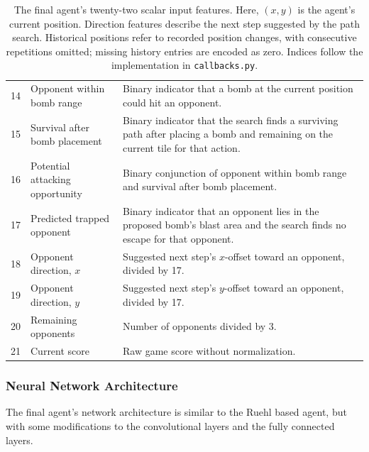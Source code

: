 \documentclass[11pt,a4paper]{article}
\begin{document}
\begin{table}[htbp]
\begin{tabularx}{\textwidth}{@{}r>{\raggedright\arraybackslash}p{4.2cm}Y@{}}
14 & Opponent within bomb range & Binary indicator that a bomb at the current position could hit an opponent. \\
15 & Survival after bomb placement & Binary indicator that the search finds a surviving path after placing a bomb and remaining on the current tile for that action. \\
16 & Potential attacking opportunity & Binary conjunction of opponent within bomb range and survival after bomb placement. \\
17 & Predicted trapped opponent & Binary indicator that an opponent lies in the proposed bomb's blast area and the search finds no escape for that opponent. \\
18 & Opponent direction, $x$ & Suggested next step's $x$-offset toward an opponent, divided by 17. \\
19 & Opponent direction, $y$ & Suggested next step's $y$-offset toward an opponent, divided by 17. \\
20 & Remaining opponents & Number of opponents divided by 3. \\
21 & Current score & Raw game score without normalization. \\
\bottomrule
\end{tabularx}
\caption{The final agent's twenty-two scalar input features.
Here, $(x,y)$ is the agent's current position.
Direction features describe the next step suggested by the path search.
Historical positions refer to recorded position changes, with consecutive
repetitions omitted; missing history entries are encoded as zero.
Indices follow the implementation in \texttt{callbacks.py}.}
\label{tab:final-agent-scalar-features}
\end{table}

\subsubsection{Neural Network Architecture}

The final agent's network architecture is similar to the Ruehl based agent, but with some modifications to the convolutional layers and the fully connected layers.
\end{document}
